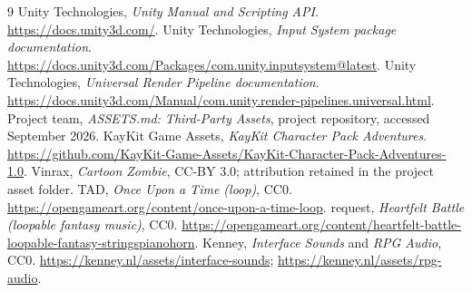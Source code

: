 \begin{thebibliography}{9}
 Unity Technologies, \emph{Unity Manual and Scripting API}. \url{https://docs.unity3d.com/}.
 Unity Technologies, \emph{Input System package documentation}. \url{https://docs.unity3d.com/Packages/com.unity.inputsystem@latest}.
 Unity Technologies, \emph{Universal Render Pipeline documentation}. \url{https://docs.unity3d.com/Manual/com.unity.render-pipelines.universal.html}.
 Project team, \emph{ASSETS.md: Third-Party Assets}, project repository, accessed September 2026.
 KayKit Game Assets, \emph{KayKit Character Pack Adventures}. \url{https://github.com/KayKit-Game-Assets/KayKit-Character-Pack-Adventures-1.0}.
 Vinrax, \emph{Cartoon Zombie}, CC-BY 3.0; attribution retained in the project asset folder.
 TAD, \emph{Once Upon a Time (loop)}, CC0. \url{https://opengameart.org/content/once-upon-a-time-loop}.
 request, \emph{Heartfelt Battle (loopable fantasy music)}, CC0. \url{https://opengameart.org/content/heartfelt-battle-loopable-fantasy-stringspianohorn}.
 Kenney, \emph{Interface Sounds} and \emph{RPG Audio}, CC0. \url{https://kenney.nl/assets/interface-sounds}; \url{https://kenney.nl/assets/rpg-audio}.
\end{thebibliography}
